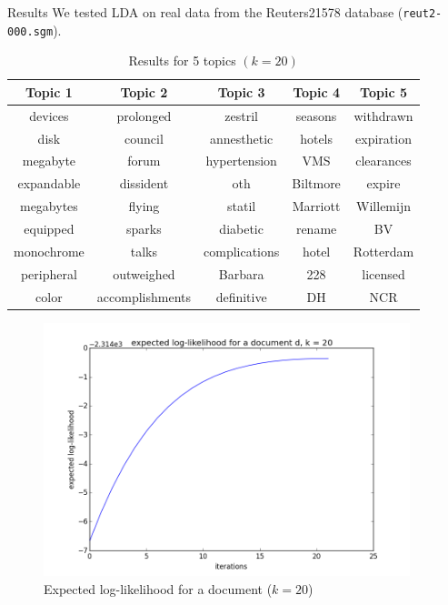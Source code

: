 \documentclass[final]{beamer}
\newlength{\sepwid}
\newlength{\onecolwid}
\begin{document}
\begin{frame}[t]
\begin{columns}[t]

\begin{column}{\sepwid}\end{column} %
\begin{column}{\onecolwid}
\begin{block}{Results}
We tested LDA on real data from the Reuters21578 database (\texttt{reut2-000.sgm}).

\begin{table}
\vspace{2ex}
\begin{footnotesize}
\begin{tabular}{ccccc}
\toprule
\textbf{Topic 1} & \textbf{Topic 2} & \textbf{Topic 3}  & \textbf{Topic 4} & \textbf{Topic 5}\\
\midrule
devices & prolonged & zestril & seasons & withdrawn \\
disk & council & annesthetic &  hotels & expiration  \\
megabyte & forum & hypertension & VMS & clearances \\
expandable & dissident & oth & Biltmore  & expire \\
megabytes & flying & statil & Marriott & Willemijn \\
equipped &  sparks & diabetic & rename & BV \\
monochrome &talks & complications & hotel & Rotterdam  \\
peripheral & outweighed & Barbara & 228 & licensed \\
color & accomplishments & definitive & DH  & NCR \\
\bottomrule
\end{tabular}
\end{footnotesize}
\caption{Results for 5 topics $(k=20)$}
\end{table}

\begin{figure}[ht!]
\begin{center}
\includegraphics[width=0.7\linewidth]{../img/k=20/log_likelihood_document_k=20.png}
\caption{Expected log-likelihood for a document ($k=20$)}
\end{center}
\end{figure}


\end{block}
\end{column}
\end{columns}
\end{frame}
\end{document}
